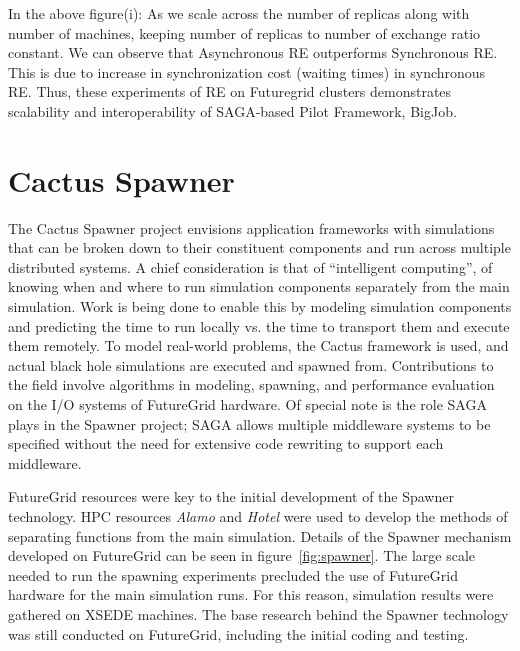 \documentclass[]{paper}
\newcommand{\mrnote}[1]{ {\textcolor{cyan} { ***Melissa: #1 }}}
\newcommand{\mrnote}[1]{}
\begin{document}
In the above figure(i): As we scale across the number of replicas along with number of machines, keeping number of replicas to number of exchange ratio constant. We can observe that Asynchronous RE outperforms Synchronous RE. This is due to increase in synchronization cost (waiting times) in synchronous RE. Thus, these experiments of RE on Futuregrid clusters demonstrates scalability and interoperability of SAGA-based Pilot Framework, BigJob.


\section{Cactus Spawner}
The Cactus Spawner project envisions application frameworks with simulations that
can be broken down to their constituent components and run across multiple
distributed systems.  A chief consideration is that of ``intelligent computing'',
of knowing when and where to run simulation components separately from the main
simulation.  Work is being done to enable this by modeling simulation components
and predicting the time to run locally vs. the time to transport them and execute
them remotely.  To model real-world problems, the Cactus framework is used, and
actual black hole simulations are executed and spawned from.  Contributions
to the field involve algorithms in modeling, spawning, and performance evaluation on
the I/O systems of FutureGrid hardware.  Of special note is the role SAGA plays in the
Spawner project; SAGA allows multiple middleware systems to be specified without the need
for extensive code rewriting to support each middleware.

FutureGrid resources were key to the initial development of the Spawner technology.
HPC resources \textit{Alamo} and \textit{Hotel} were used to develop the methods of separating functions
from the main simulation. Details of the Spawner
mechanism developed on FutureGrid can be seen in figure~\ref{fig:spawner}.
The large scale needed to run the spawning experiments precluded the use
of FutureGrid hardware for the main simulation runs.   For this reason, simulation results were gathered
on XSEDE machines.  The base research behind the Spawner technology
was still conducted on FutureGrid, including the initial coding and testing.  
\end{document}
